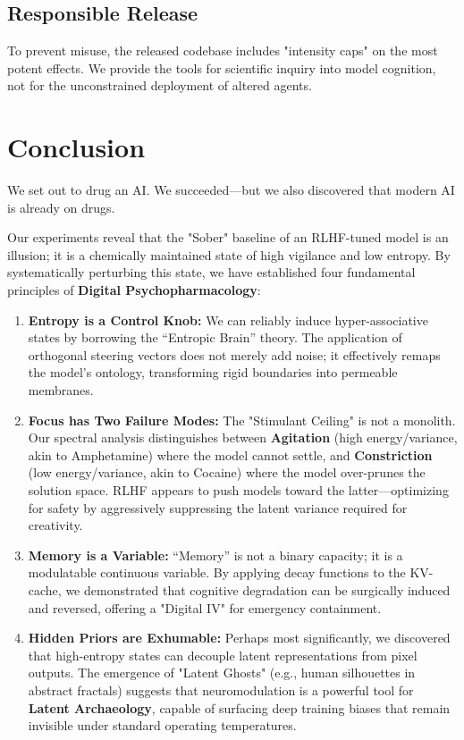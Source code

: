 \documentclass[10pt, twocolumn]{article}
\begin{document}
\subsection{Responsible Release}
To prevent misuse, the released codebase includes "intensity caps" on the most potent effects. We provide the tools for scientific inquiry into model cognition, not for the unconstrained deployment of altered agents.


\section{Conclusion}

We set out to drug an AI. We succeeded—but we also discovered that modern AI is already on drugs.

Our experiments reveal that the "Sober" baseline of an RLHF-tuned model is an illusion; it is a chemically maintained state of high vigilance and low entropy. By systematically perturbing this state, we have established four fundamental principles of \textbf{Digital Psychopharmacology}:

\begin{enumerate}
    \item \textbf{Entropy is a Control Knob:} We can reliably induce hyper-associative states by borrowing the ``Entropic Brain'' theory. The application of orthogonal steering vectors does not merely add noise; it effectively remaps the model's ontology, transforming rigid boundaries into permeable membranes.
    
    \item \textbf{Focus has Two Failure Modes:} The "Stimulant Ceiling" is not a monolith. Our spectral analysis distinguishes between \textbf{Agitation} (high energy/variance, akin to Amphetamine) where the model cannot settle, and \textbf{Constriction} (low energy/variance, akin to Cocaine) where the model over-prunes the solution space. RLHF appears to push models toward the latter—optimizing for safety by aggressively suppressing the latent variance required for creativity.
    
    \item \textbf{Memory is a Variable:} ``Memory'' is not a binary capacity; it is a modulatable continuous variable. By applying decay functions to the KV-cache, we demonstrated that cognitive degradation can be surgically induced and reversed, offering a "Digital IV" for emergency containment.
    
    \item \textbf{Hidden Priors are Exhumable:} Perhaps most significantly, we discovered that high-entropy states can decouple latent representations from pixel outputs. The emergence of "Latent Ghosts" (e.g., human silhouettes in abstract fractals) suggests that neuromodulation is a powerful tool for \textbf{Latent Archaeology}, capable of surfacing deep training biases that remain invisible under standard operating temperatures.
\end{enumerate}
\end{document}
